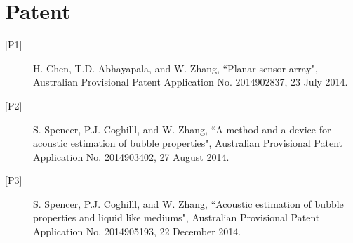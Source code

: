 \documentclass[10pt]{article}
\begin{document}
\section*{Patent}
\vspace{-1mm}
\begin{description}

\item[{[}P1{]}]H. Chen, T.D. Abhayapala, and W. Zhang, ``Planar sensor array", Australian Provisional Patent Application No. 2014902837, 23 July 2014.

\item[{[}P2{]}]S. Spencer, P.J. Coghilll, and W. Zhang, ``A method and a device for acoustic estimation of bubble properties", Australian Provisional Patent Application No. 2014903402, 27 August 2014.

\item[{[}P3{]}]S. Spencer, P.J. Coghilll, and W. Zhang, ``Acoustic estimation of bubble properties and liquid like mediums", Australian Provisional Patent Application No. 2014905193, 22 December 2014.

\vspace{-4mm}
\end{description}

%
%
\end{document}
